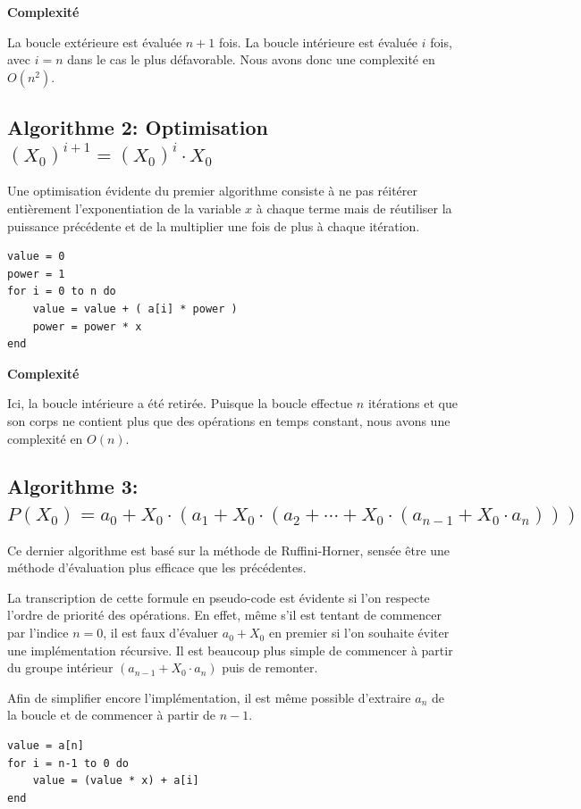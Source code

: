 \documentclass[11pt,a4paper]{article}
\begin{document}
\textbf{Complexité}

La boucle extérieure est évaluée $n+1$ fois. La boucle intérieure est évaluée $i$ fois, avec $i = n$ dans le cas le plus défavorable. Nous avons donc une complexité en $O(n^{2})$.

\subsection{Algorithme 2: Optimisation $ (X_{0})^{i+1} = (X_{0})^{i} \cdot X_{0} $}

Une optimisation évidente du premier algorithme consiste à ne pas réitérer entièrement l'exponentiation de la variable $x$ à chaque terme mais de réutiliser la puissance précédente et de la multiplier une fois de plus à chaque itération.

\vspace{1em} \begin{lstlisting}
value = 0
power = 1
for i = 0 to n do
	value = value + ( a[i] * power )
	power = power * x
end
\end{lstlisting}

\textbf{Complexité}

Ici, la boucle intérieure a été retirée. Puisque la boucle effectue $n$ itérations et que son corps ne contient plus que des opérations en temps constant, nous avons une complexité en $O(n)$.

\subsection{Algorithme 3: $ P(X_{0}) = a_{0} + X_{0} \cdot (a_{1} + X_{0} \cdot (a_{2} + \cdots + X_{0} \cdot (a_{n-1} + X_{0} \cdot a_{n}))) $}

Ce dernier algorithme est basé sur la méthode de Ruffini-Horner, sensée être une méthode d'évaluation plus efficace que les précédentes.

La transcription de cette formule en pseudo-code est évidente si l'on respecte l'ordre de priorité des opérations. En effet, même s'il est tentant de commencer par l'indice $n = 0$, il est faux d'évaluer $a_{0} + X_{0}$ en premier si l'on souhaite éviter une implémentation récursive. Il est beaucoup plus simple de commencer à partir du groupe intérieur $(a_{n-1} + X_{0} \cdot a_{n})$ puis de remonter. 

Afin de simplifier encore l'implémentation, il est même possible d'extraire $a_{n}$ de la boucle et de commencer à partir de $n-1$.

\vspace{1em} \begin{lstlisting}
value = a[n]
for i = n-1 to 0 do
	value = (value * x) + a[i]
end
\end{lstlisting}
\end{document}
